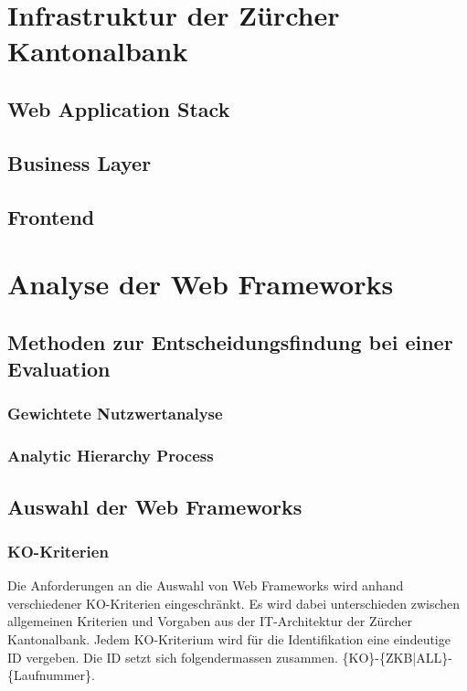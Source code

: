 \documentclass[
11pt, %
a4paper, %
BCOR25mm, %
DIV14, %
footsepline = false, %
headsepline, %
twoside, %
openright,
abstracton, %
listof=totocnumbered, %
bibliography=totocnumbered %
]{scrreprt}
\begin{document}
  \chapter{Infrastruktur der Zürcher Kantonalbank}
  
  \section{Web Application Stack}
  
  \section{Business Layer}
  
  \section{Frontend}
  
  \chapter{Analyse der Web Frameworks}
  
  \section{Methoden zur Entscheidungsfindung bei einer Evaluation}
  
  \subsection{Gewichtete Nutzwertanalyse}
    
  \subsection{Analytic Hierarchy Process}
    
  \section{Auswahl der Web Frameworks}
    
  \subsection{KO-Kriterien}
  
  Die Anforderungen an die Auswahl von Web Frameworks wird anhand verschiedener
  KO-Kriterien eingeschränkt. Es wird dabei unterschieden zwischen allgemeinen
  Kriterien und Vorgaben aus der IT-Architektur der Zürcher Kantonalbank. Jedem
  KO-Kriterium wird für die Identifikation eine eindeutige ID vergeben. Die ID
  setzt sich folgendermassen zusammen. \{KO\}-\{ZKB|ALL\}-\{Laufnummer\}.
  
\end{document}
